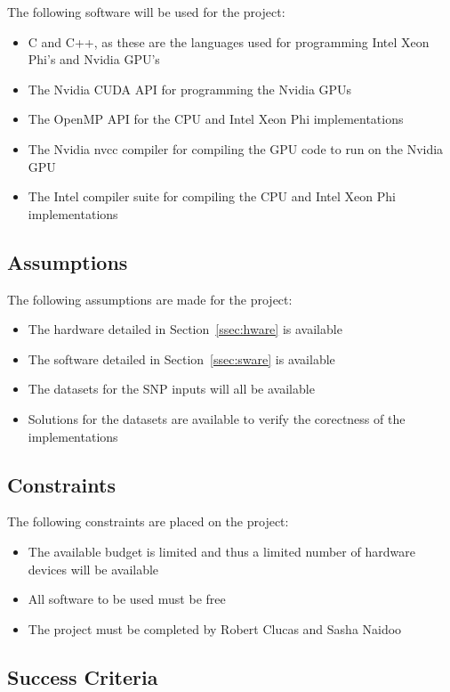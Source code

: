 \documentclass[10pt,a4paer,twocolumn]{article}
\begin{document}
The following software will be used for the project:
\begin{itemize}[noitemsep]
    \item{C and C++, as these are the languages used for programming Intel Xeon Phi's and Nvidia GPU's}
    \item{The Nvidia CUDA API for programming the Nvidia GPUs}
    \item{The OpenMP API for the CPU and Intel Xeon Phi implementations}
    \item{The Nvidia nvcc compiler for compiling the GPU code to run on the Nvidia GPU}
    \item{The Intel compiler suite for compiling the CPU and Intel Xeon Phi implementations}
\end{itemize}

\subsection{Assumptions}

The following assumptions are made for the project:
\begin{itemize}[noitemsep]
    \item{The hardware detailed in Section~\ref{ssec:hware} is available}
    \item{The software detailed in Section~\ref{ssec:sware} is available}
    \item{The datasets for the SNP inputs will all be available}
    \item{Solutions for the datasets are available to verify the corectness of the implementations}
\end{itemize}

\subsection{Constraints}

The following constraints are placed on the project:
\begin{itemize}[noitemsep]
    \item{The available budget is limited and thus a limited number of hardware devices will be available}
    \item{All software to be used must be free}
    \item{The project must be completed by Robert Clucas and Sasha Naidoo}
\end{itemize}

\subsection{Success Criteria}
\end{document}
